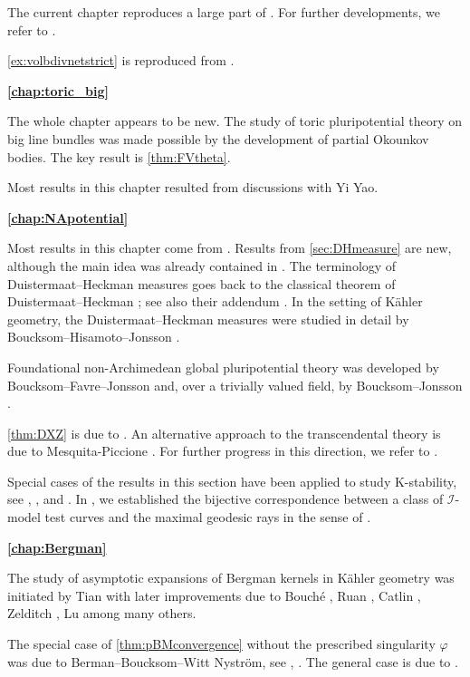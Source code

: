 The current chapter reproduces a large part of \cite{Xiabdiv}. For further developments, we refer to \cite{Xiabdiv2}.

\cref{ex:volbdivnetstrict} is reproduced from \cite[Example~3.3]{DF20}.


\textbf{\cref{chap:toric_big}}

The whole chapter appears to be new. The study of toric pluripotential theory on big line bundles was made possible by the development of partial Okounkov bodies. The key result is \cref{thm:FVtheta}.

Most results in this chapter resulted from discussions with Yi Yao.

\textbf{\cref{chap:NApotential}}

Most results in this chapter come from \cite{Xia23Operations}. Results from \cref{sec:DHmeasure} are new, although the main idea was already contained in \cite{Xia21}. The terminology of Duistermaat--Heckman measures goes back to the classical theorem of Duistermaat--Heckman \cite{DH82}; see also their addendum \cite{DH83}. In the setting of K\"ahler geometry, the Duistermaat--Heckman measures were studied in detail by Boucksom--Hisamoto--Jonsson \cite{BHJ17}.

Foundational non-Archimedean global pluripotential theory was developed by Boucksom--Favre--Jonsson \cite{BFJ16b} and, over a trivially valued field, by Boucksom--Jonsson \cite{BJ22}.

\cref{thm:DXZ} is due to \cite{DXZ23}.
An alternative approach to the transcendental theory is due to Mesquita-Piccione \cite{MP24}. For further progress in this direction, we refer to \cite{MPWN25, WN25}.

Special cases of the results in this section have been applied to study K-stability, see \cite{XiaPPT}, \cite{DZ22}, \cite{DXZ23} and \cite{DR22}. In \cite{DX22}, we established the bijective correspondence between a class of $\mathcal{I}$-model test curves and the maximal geodesic rays in the sense of \cite{BBJ21}.

\textbf{\cref{chap:Bergman}}

The study of asymptotic expansions of Bergman kernels in K\"ahler geometry was initiated by Tian \cite{Ti90} with later improvements due to Bouch\'e \cite{Bou90}, Ruan \cite{Rua98}, Catlin \cite{Cat99}, Zelditch \cite{Zel98}, Lu \cite{Lu00} among many others.

The special case of \cref{thm:pBMconvergence} without the prescribed singularity $\varphi$ was due to Berman--Boucksom--Witt Nystr\"om, see \cite{BB10}, \cite{BBWN11}. The general case is due to \cite{DX21}.
